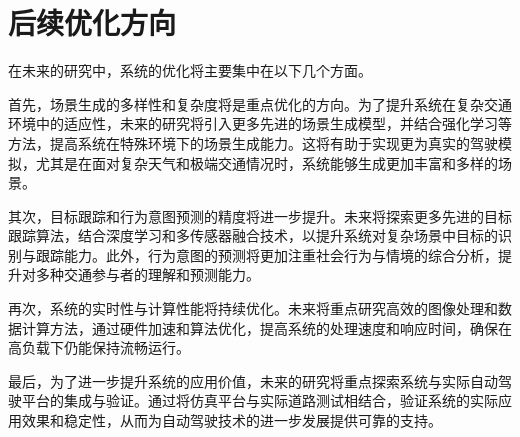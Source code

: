 \section{后续优化方向}

在未来的研究中，系统的优化将主要集中在以下几个方面。

首先，场景生成的多样性和复杂度将是重点优化的方向。为了提升系统在复杂交通环境中的适应性，未来的研究将引入更多先进的场景生成模型，并结合强化学习等方法，提高系统在特殊环境下的场景生成能力。这将有助于实现更为真实的驾驶模拟，尤其是在面对复杂天气和极端交通情况时，系统能够生成更加丰富和多样的场景。

其次，目标跟踪和行为意图预测的精度将进一步提升。未来将探索更多先进的目标跟踪算法，结合深度学习和多传感器融合技术，以提升系统对复杂场景中目标的识别与跟踪能力。此外，行为意图的预测将更加注重社会行为与情境的综合分析，提升对多种交通参与者的理解和预测能力。

再次，系统的实时性与计算性能将持续优化。未来将重点研究高效的图像处理和数据计算方法，通过硬件加速和算法优化，提高系统的处理速度和响应时间，确保在高负载下仍能保持流畅运行。

最后，为了进一步提升系统的应用价值，未来的研究将重点探索系统与实际自动驾驶平台的集成与验证。通过将仿真平台与实际道路测试相结合，验证系统的实际应用效果和稳定性，从而为自动驾驶技术的进一步发展提供可靠的支持。







\begin{tabular}{l l}
\end{tabular}